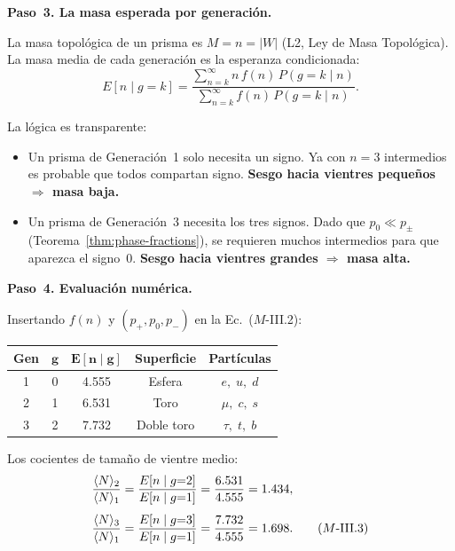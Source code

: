 \documentclass[11pt, a4paper, openany]{book}
\begin{document}
\bigskip
\noindent
\textbf{Paso~3. La masa esperada por generaci\'on.}

La masa topol\'ogica de un prisma es $M = n = |W|$ (L2, Ley de Masa
Topol\'ogica). La masa media de cada generaci\'on es la esperanza
condicionada:
\begin{equation}
  E[n \mid g = k]
  = \frac{\displaystyle\sum_{n=k}^{\infty} n\,f(n)\,P(g{=}k \mid n)}
         {\displaystyle\sum_{n=k}^{\infty} f(n)\,P(g{=}k \mid n)}.
  \tag{$M$-III.2}
\end{equation}

La l\'ogica es transparente:
\begin{itemize}
  \item Un prisma de Generaci\'on~1 solo necesita un signo. Ya con
        $n = 3$ intermedios es probable que todos compartan signo.
        \textbf{Sesgo hacia vientres peque\~nos $\Longrightarrow$ masa
        baja.}
  \item Un prisma de Generaci\'on~3 necesita los tres signos. Dado que
        $p_0 \ll p_\pm$ (Teorema~\ref{thm:phase-fractions}), se
        requieren muchos intermedios para que aparezca el signo~$0$.
        \textbf{Sesgo hacia vientres grandes $\Longrightarrow$ masa
        alta.}
\end{itemize}

\bigskip
\noindent
\textbf{Paso~4. Evaluaci\'on num\'erica.}

Insertando $f(n)$ y $(p_+, p_0, p_-)$ en la Ec.~($M$-III.2):
\begin{center}
\renewcommand{\arraystretch}{1.3}
\begin{tabular}{ccccc}
\toprule
\textbf{Gen} & $\boldsymbol{g}$ & $\boldsymbol{E[n \mid g]}$
  & \textbf{Superficie} & \textbf{Part\'iculas} \\
\midrule
1 & 0 & 4.555 & Esfera      & $e,\; u,\; d$ \\
2 & 1 & 6.531 & Toro        & $\mu,\; c,\; s$ \\
3 & 2 & 7.732 & Doble toro  & $\tau,\; t,\; b$ \\
\bottomrule
\end{tabular}
\end{center}

Los cocientes de tama\~no de vientre medio:
\begin{align}
  \frac{\langle N\rangle_2}{\langle N\rangle_1}
  &= \frac{E[n \mid g{=}2]}{E[n \mid g{=}1]}
  = \frac{6{.}531}{4{.}555}
  = 1{.}434, \notag\\[4pt]
  \frac{\langle N\rangle_3}{\langle N\rangle_1}
  &= \frac{E[n \mid g{=}3]}{E[n \mid g{=}1]}
  = \frac{7{.}732}{4{.}555}
  = 1{.}698.
  \tag{$M$-III.3}
\end{align}
\end{document}
